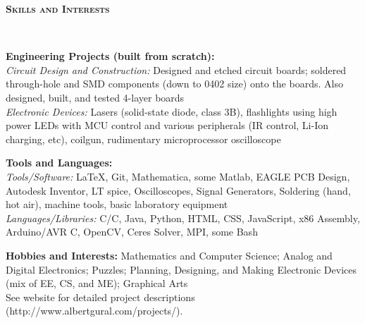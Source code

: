 \documentclass{article}
\newenvironment{changemargin}[2]{%
  \begin{list}{}{%
    \setlength{\topsep}{0pt}%
    \setlength{\leftmargin}{#1}%
    \setlength{\rightmargin}{#2}%
    \setlength{\listparindent}{\parindent}%
    \setlength{\itemindent}{\parindent}%
    \setlength{\parsep}{\parskip}%
  }%
  \item[]}{\end{list}
}
\newcommand{\lineover}{
	\begin{changemargin}{-0.05in}{-0.05in}
		\vspace*{-8pt}
		\hrulefill \\
		\vspace*{-2pt}
	\end{changemargin}
}
\newcommand{\header}[1]{
	\begin{changemargin}{-0.5in}{-0.5in}
		{\large \textbf{\scshape{#1}}}\\
  	\lineover
	\end{changemargin}
}
\newenvironment{body} {
	\vspace*{-16pt}
	\begin{changemargin}{-0.25in}{-0.5in}
  }	
	{\end{changemargin}
}
\newcommand{\CC}{C\nolinebreak\hspace{-.05em}\raisebox{.4ex}{\tiny\bf +}\nolinebreak\hspace{-.10em}\raisebox{.4ex}{\tiny\bf +}}
\begin{document}
\smallskip


\header{Skills and Interests}

\begin{body}
	\vspace{14pt}
	\textbf{Engineering Projects (built from scratch):} \\
	\textit{Circuit Design and Construction:} Designed and etched circuit boards; soldered through-hole and SMD components (down to 0402 size) onto the boards.  Also designed, built, and tested 4-layer boards \\
	\textit{Electronic Devices:} Lasers (solid-state diode, class 3B), flashlights using high power LEDs with MCU control and various peripherals (IR control, Li-Ion charging, etc), coilgun, rudimentary microprocessor oscilloscope \\
	
	\medskip

	\textbf{Tools and Languages:} \\
	\textit{Tools/Software:} \LaTeX, Git, Mathematica, some Matlab, EAGLE PCB Design, Autodesk Inventor, LT spice, Oscilloscopes, Signal Generators, Soldering (hand, hot air), machine tools, basic laboratory equipment \\
	\textit{Languages/Libraries:} C/\CC, Java, Python, HTML, CSS, JavaScript, x86 Assembly, Arduino/AVR C, OpenCV, Ceres Solver, MPI, some Bash \\

	\medskip

	\textbf{Hobbies and Interests:} Mathematics and Computer Science; Analog and Digital Electronics; Puzzles; Planning, Designing, and Making Electronic Devices (mix of EE, CS, and ME); Graphical Arts \\ See website for detailed project descriptions (http://www.albertgural.com/projects/). \\
\end{body}

\smallskip
\end{document}
